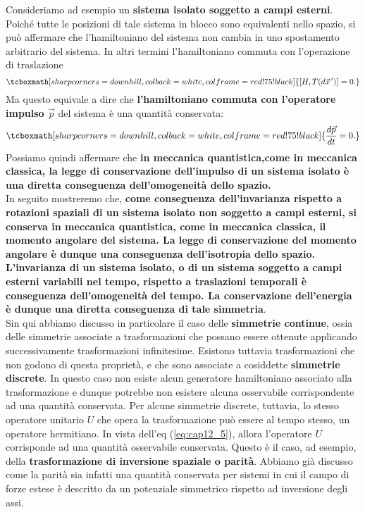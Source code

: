 \documentclass[a4paper,12pt,oneside]{book}
\begin{document}
Consideriamo ad esempio un \textbf{sistema isolato soggetto a campi esterni}. Poiché tutte le posizioni di tale sistema in blocco sono equivalenti nello spazio, si può affermare che l'hamiltoniano del sistema non cambia in uno spostamento arbitrario del sistema. In altri termini l'hamiltoniano commuta con l'operazione di traslazione
	\begin{equation}
		\tcboxmath[sharp corners=downhill, colback=white, colframe=red!75!black]{
			[H,T (d\vec{x}^{\, \prime})]=0.
			}
\end{equation}
Ma questo equivale a dire che \textbf{l'hamiltoniano commuta con l'operatore impulso $\vec{p}$} del sistema è una quantità conservata:
	\begin{equation}
		\tcboxmath[sharp corners=downhill, colback=white, colframe=red!75!black]{
			\frac{d\vec{p}}{dt}=0.
			}
	\end{equation}
Possiamo quindi affermare che \textbf{in meccanica quantistica,come in meccanica classica, la legge di conservazione dell'impulso di un sistema isolato è una diretta conseguenza dell'omogeneità dello spazio.}\\

In seguito mostreremo che, \textbf{come conseguenza dell'invarianza rispetto a rotazioni spaziali di un sistema isolato non soggetto a campi esterni, si conserva in meccanica quantistica, come in meccanica classica, il momento angolare del sistema. La legge di conservazione del momento angolare è dunque una conseguenza dell'isotropia dello spazio.}\\

\textbf{L'invarianza di un sistema isolato, o di un sistema soggetto a campi esterni variabili nel tempo, rispetto a traslazioni temporali è conseguenza dell'omogeneità del tempo. La conservazione dell'energia è dunque una diretta conseguenza di tale simmetria}.\\

Sin qui abbiamo discusso in particolare il caso delle \textbf{simmetrie continue}, ossia delle simmetrie associate a trasformazioni che possano essere ottenute applicando successivamente trasformazioni infinitesime.
Esistono tuttavia trasformazioni che non godono di questa proprietà, e che sono associate a cosiddette \textbf{simmetrie discrete}. In questo caso non esiste alcun generatore hamiltoniano associato alla trasformazione e dunque potrebbe non esistere alcuna osservabile corrispondente ad una quantità conservata. Per alcune simmetrie discrete, tuttavia, lo stesso operatore unitario $U$ che opera la trasformazione può essere al tempo stesso, un operatore hermitiano. In vista dell'eq (\ref{eq:cap12_5}), allora l'operatore $U$ corrisponde ad una quantità osservabile conservata. Questo è il caso, ad esempio, della \textbf{trasformazione di inversione spaziale o parità}. Abbiamo già discusso come la parità sia infatti una quantità conservata per sistemi in cui il campo di forze estese è descritto da un potenziale simmetrico rispetto ad inversione degli assi.
\end{document}
